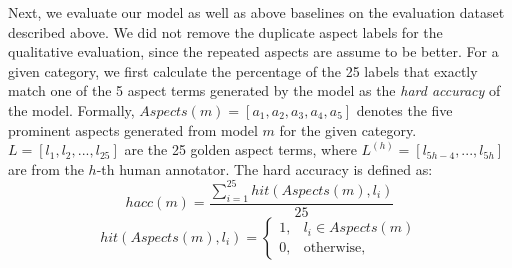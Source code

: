 Next, we evaluate our model as well as above baselines on the evaluation dataset described above.
We did not remove the duplicate aspect labels for the qualitative evaluation, 
since the repeated aspects are assume to be better.
For a given category, we first calculate the percentage of the 25 labels that exactly match one of the 5 aspect terms generated by the model 
as the \textit{hard accuracy} 
of the model. 
Formally, $Aspects(m) = [a_1, a_2, a_3, a_4, a_5]$ denotes 
the five prominent aspects generated from model $m$ for 
the given category.
$L = [l_1, l_2, ..., l_{25}]$ are the 25 golden aspect terms,
where $L^{(h)}= [l_{5h-4}, ..., l_{5h}]$ are from the $h$-th human annotator.
The hard accuracy is defined as:
\begin{equation}
	hacc(m) = \frac{\sum_{i=1}^{25}{hit(Aspects(m), l_i)}}{25}
\end{equation}
\begin{equation}
hit(Aspects(m), l_i) = 
\begin{cases}
1, & l_i \in Aspects(m) \\
0, & \text{otherwise, }
\end{cases}
\end{equation}

